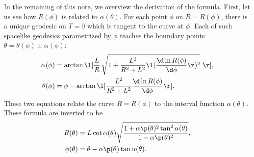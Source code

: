 \documentclass[12pt]{article}
\begin{document}
In the remaining of this note, we overview the derivation of the formula.
First, let us see how $R(\phi)$ is related to $\alpha(\theta)$.
For each point $\phi$ on $R=R(\phi)$, there is a unique geodesic on $T=0$ which is tangent to the curve at $\phi$.
Each of such spacelike geodesics parametrized by $\phi$ reaches the boundary points $\theta = \theta(\phi) \pm \alpha(\phi)$:
\begin{align}
	\alpha(\phi) &= \arctan\l[\frac{L}{R}\,\sqrt{1 + \frac{L^2}{R^2+L^2}\l(\frac{\d \ln R(\phi)}{\d\phi} \r)^2} \,\,\r],\\
	\theta(\phi) &= \phi - \arctan\l[\frac{L^2}{R^2 + L^2}\frac{\d\ln R(\phi)}{\d \phi} \r].
\end{align}
These two equations relate the curve $R=R(\phi)$ to the interval function $\alpha(\theta)$.
These formula are inverted to be
\begin{align}
	R(\theta) &= L\cot\alpha(\theta) \sqrt{\frac{1 + \alpha\p(\theta)^2\tan^2\alpha(\theta)}{1-\alpha\p(\theta)^2}},\label{eq:R}\\
	\phi(\theta) &= \theta - \alpha\p(\theta)\tan\alpha(\theta).\label{eq:phi}
\end{align}
\end{document}
